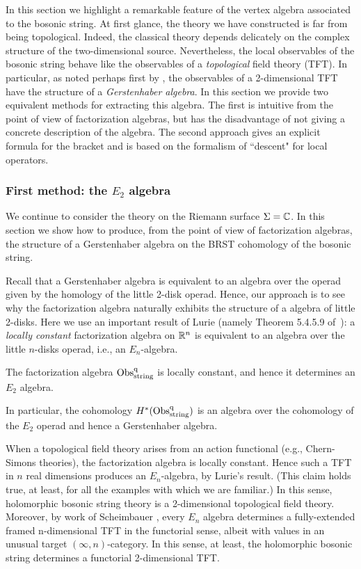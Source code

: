 In this section we highlight a remarkable feature of the vertex algebra associated to the bosonic string. 
At first glance, the theory we have constructed is far from being topological.
Indeed, the classical theory depends delicately on the complex structure of the two-dimensional source. 
Nevertheless, the local observables of the bosonic string behave like the observables of a {\em topological} field theory (TFT). 
In particular, as noted perhaps first by \cite{Getzler}, the observables of a 2-dimensional TFT have the structure of a {\em Gerstenhaber algebra}.
In this section we provide two equivalent methods for extracting this algebra.
The first is intuitive from the point of view of factorization algebras, but has the disadvantage of not giving a concrete description of the algebra. 
The second approach gives an explicit formula for the bracket and is based on the formalism of ``descent" for local operators. 

\subsubsection{First method: the $E_2$ algebra}

We continue to consider the theory on the Riemann surface $\Sigma = \mathbb C$. 
In this section we show how to produce, from the point of view of factorization algebras, the structure of a Gerstenhaber algebra on the BRST cohomology of the bosonic string. 

Recall that a Gerstenhaber algebra is equivalent to an algebra over the operad given by the homology of the little 2-disk operad.
Hence, our approach is to see why the factorization algebra naturally exhibits the structure of a algebra of little 2-disks.
Here we use an important result of Lurie (namely Theorem 5.4.5.9 of~\cite{Lurie}): 
a {\em locally constant} factorization algebra on $\mathbb R^n$ is equivalent to an algebra over the little $n$-disks operad, i.e., an $E_n$-algebra. 

\begin{prop} 
\label{prop: obs is e2}
The factorization algebra ${\rm Obs}^{\rm q}_{\rm string}$ is locally constant, 
and hence it determines an $E_2$ algebra.
\end{prop}

In particular, the cohomology $H^*({\rm Obs}^{\rm q}_{\rm string})$ is an algebra over the cohomology of the $E_2$ operad and hence a Gerstenhaber algebra.

\begin{rmk}
When a topological field theory arises from an action functional (e.g., Chern-Simons theories),
the factorization algebra is locally constant.
Hence such a TFT in $n$ real dimensions produces an $E_n$-algebra, by Lurie's result. 
(This claim holds true, at least, for all the examples with which we are familiar.)
In this sense, holomorphic bosonic string theory is a 2-dimensional topological field theory. 
Moreover, by work of Scheimbauer \cite{Scheim},
every $E_n$ algebra determines a fully-extended framed n-dimensional TFT in the functorial sense, albeit with values in an unusual target $(\infty,n)$-category.
In this sense, at least, the holomorphic bosonic string determines a functorial 2-dimensional TFT.
\end{rmk}

